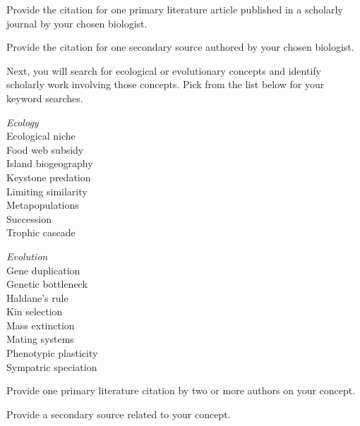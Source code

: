 \documentclass[12pt, addpoints, hidelinks]{exam}
\newcommand*\AnswerBox[2]{%
    \parbox[t][#1]{0.92\textwidth}{%
    \begin{solution}#2\end{solution}}
    \vspace*{\stretch{1}}
}
\begin{document}
\begin{questions}

\question[1]
Provide the citation for one primary literature article published in a
scholarly journal by your chosen biologist.


\question[1]
Provide the citation for one secondary source authored by your
chosen biologist.


\newpage

Next, you will search for ecological or evolutionary concepts and identify
scholarly work involving those concepts. Pick from the list
below for your keyword searches.

\begin{multicols}{2}
\textit{Ecology}\\
Ecological niche \\
Food web subsidy \\
Island biogeography \\
Keystone predation \\
Limiting similarity \\
Metapopulations \\
Succession \\
Trophic cascade

\columnbreak

\textit{Evolution}\\
Gene duplication \\
Genetic bottleneck \\
Haldane's rule \\
Kin selection \\
Mass extinction \\
Mating systems \\
Phenotypic plasticity \\
Sympatric speciation \\ 
\end{multicols}

\vspace*{-\baselineskip}

\question[1]
Provide one primary literature citation by two or more authors on your
concept.

\AnswerBox{1\baselineskip}{}

\question[1]
Provide a secondary source related to your concept.

\AnswerBox{1\baselineskip}{}


\end{questions}
\end{document}
